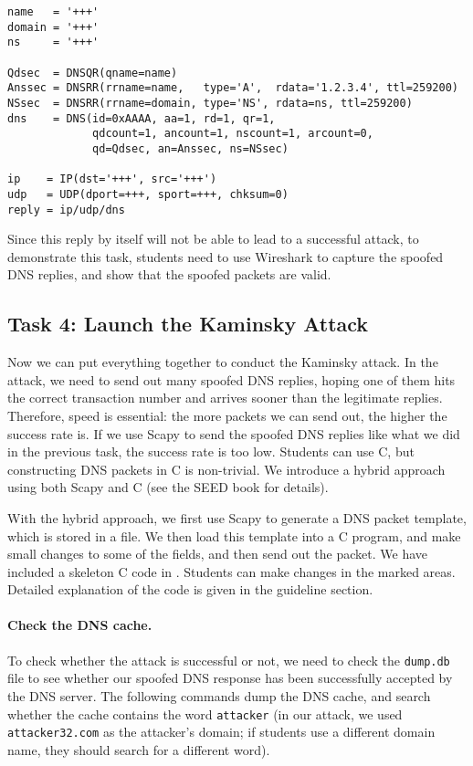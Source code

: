 \begin{lstlisting}
name   = '+++'  
domain = '+++'  
ns     = '+++'

Qdsec  = DNSQR(qname=name)
Anssec = DNSRR(rrname=name,   type='A',  rdata='1.2.3.4', ttl=259200)
NSsec  = DNSRR(rrname=domain, type='NS', rdata=ns, ttl=259200)
dns    = DNS(id=0xAAAA, aa=1, rd=1, qr=1,
             qdcount=1, ancount=1, nscount=1, arcount=0,
             qd=Qdsec, an=Anssec, ns=NSsec)

ip    = IP(dst='+++', src='+++')
udp   = UDP(dport=+++, sport=+++, chksum=0)
reply = ip/udp/dns
\end{lstlisting}
 

Since this reply by itself will not be able to lead to a successful 
attack, to demonstrate this task, students need to 
use Wireshark to capture the spoofed DNS replies, and 
show that the spoofed packets are valid. 


\subsection{Task 4: Launch the Kaminsky Attack}   

Now we can put everything together to conduct the Kaminsky attack. 
In the attack, we need to send out many spoofed DNS replies, hoping 
one of them hits the correct transaction number and arrives sooner
than the legitimate replies. Therefore, speed is essential: the more packets 
we can send out, the higher the success rate is. If we use 
Scapy to send the spoofed DNS replies like what we did in the 
previous task, the success rate is too low. Students can use 
C, but constructing DNS packets in C is non-trivial. 
We introduce a hybrid approach using both Scapy and C (see the SEED
book for details). 


With the hybrid approach, we first use Scapy to generate 
a DNS packet template, which is stored in a file. 
We then load this template into a C program, and make 
small changes to some of the fields, and then send 
out the packet. 
We have included a skeleton C code
in . 
Students can make changes
in the marked areas. Detailed explanation
of the code is given in the 
guideline section.


\paragraph{Check the DNS cache.}
To check whether the attack is successful or not, we need to 
check the {\tt dump.db} file to see whether our spoofed DNS
response has been successfully accepted by the DNS server. 
The following commands dump the DNS cache, and search whether
the cache contains the word \texttt{attacker} (in our 
attack, we used \texttt{attacker32.com} as the attacker's 
domain; if students use a different domain name, they should 
search for a different word).  

